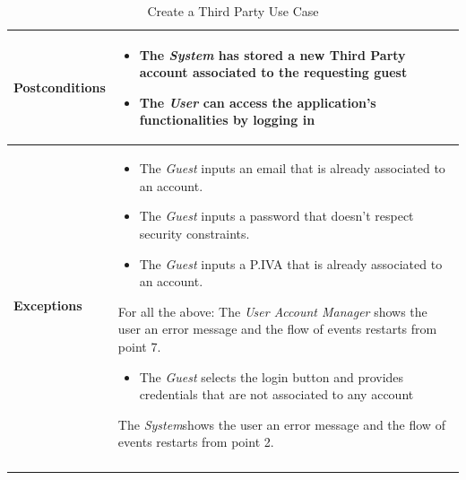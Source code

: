 \documentclass[titlepage]{article}
\begin{document}
\begin{longtable}{| p{3 cm} | p{10 cm} |}
			 \\
			\hline
			{\bf Postconditions} & 
							\begin{itemize}
								\item The {\it System} has stored a new Third Party account associated to the 										requesting guest
								\item The {\it User} can access the application’s functionalities by logging in
							\end{itemize}
			\\
			\hline
			{\bf Exceptions} & 
							\begin{itemize}
								\item The {\it Guest} inputs an email that is already associated to an account. 
								\item The {\it Guest} inputs a password that doesn’t respect security constraints. 								\item The 	{\it Guest} inputs a P.IVA that is already associated to an account. 
							\end{itemize} 
							For all the above: The {\it User Account Manager} shows the user an error message and the flow of events restarts from point 7.
							\begin{itemize}
								\item The {\it Guest}  selects the login button and provides credentials that are not 									associated to any account
							\end{itemize} 
							The {\it System}shows the user an error message and the flow of events 							restarts from point 2.
							
			\\
			\hline
			\caption{Create a Third Party Use Case}
			\end{longtable}
\end{document}
